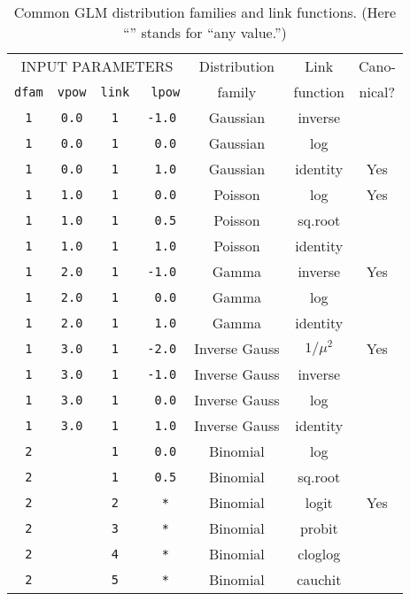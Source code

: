 \begin{table}[t]\hfil
\begin{tabular}{|ccccccc|}
\hline
\multicolumn{4}{|c}{INPUT PARAMETERS}              & Distribution  & Link      & Cano- \\
{\tt dfam} & {\tt vpow} & {\tt link} & {\tt\ lpow} & family        & function  & nical?\\
\hline
{\tt 1}    & {\tt 0.0}  & {\tt 1}    & {\tt -1.0}  & Gaussian      & inverse   &       \\
{\tt 1}    & {\tt 0.0}  & {\tt 1}    & {\tt\ 0.0}  & Gaussian      & log       &       \\
{\tt 1}    & {\tt 0.0}  & {\tt 1}    & {\tt\ 1.0}  & Gaussian      & identity  & Yes   \\
{\tt 1}    & {\tt 1.0}  & {\tt 1}    & {\tt\ 0.0}  & Poisson       & log       & Yes   \\
{\tt 1}    & {\tt 1.0}  & {\tt 1}    & {\tt\ 0.5}  & Poisson       & sq.root   &       \\
{\tt 1}    & {\tt 1.0}  & {\tt 1}    & {\tt\ 1.0}  & Poisson       & identity  &       \\
{\tt 1}    & {\tt 2.0}  & {\tt 1}    & {\tt -1.0}  & Gamma         & inverse   & Yes   \\
{\tt 1}    & {\tt 2.0}  & {\tt 1}    & {\tt\ 0.0}  & Gamma         & log       &       \\
{\tt 1}    & {\tt 2.0}  & {\tt 1}    & {\tt\ 1.0}  & Gamma         & identity  &       \\
{\tt 1}    & {\tt 3.0}  & {\tt 1}    & {\tt -2.0}  & Inverse Gauss & $1/\mu^2$ & Yes   \\
{\tt 1}    & {\tt 3.0}  & {\tt 1}    & {\tt -1.0}  & Inverse Gauss & inverse   &       \\
{\tt 1}    & {\tt 3.0}  & {\tt 1}    & {\tt\ 0.0}  & Inverse Gauss & log       &       \\
{\tt 1}    & {\tt 3.0}  & {\tt 1}    & {\tt\ 1.0}  & Inverse Gauss & identity  &       \\
\hline
{\tt 2}    & {\tt  *}   & {\tt 1}    & {\tt\ 0.0}  & Binomial      & log       &       \\
{\tt 2}    & {\tt  *}   & {\tt 1}    & {\tt\ 0.5}  & Binomial      & sq.root   &       \\
{\tt 2}    & {\tt  *}   & {\tt 2}    & {\tt\  *}   & Binomial      & logit     & Yes   \\
{\tt 2}    & {\tt  *}   & {\tt 3}    & {\tt\  *}   & Binomial      & probit    &       \\
{\tt 2}    & {\tt  *}   & {\tt 4}    & {\tt\  *}   & Binomial      & cloglog   &       \\
{\tt 2}    & {\tt  *}   & {\tt 5}    & {\tt\  *}   & Binomial      & cauchit   &       \\
\hline
\end{tabular}\hfil
\caption{Common GLM distribution families and link functions.
(Here ``{\tt *}'' stands for ``any value.'')}
\label{table:commonGLMs}
\end{table}

